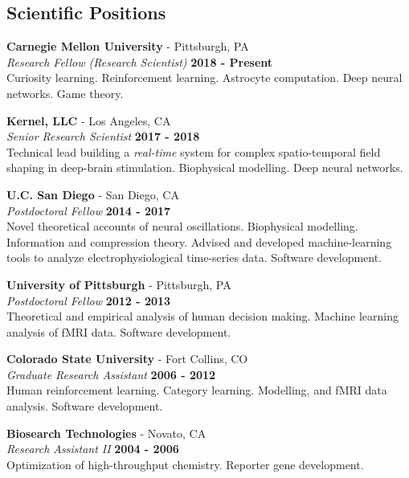 \documentclass[margin,line]{res}
\begin{document}
\begin{resume}
\section{\sc Scientific Positions}

{\bf Carnegie Mellon University} - Pittsburgh, PA \\
{\em Research Fellow (Research Scientist)} \hfill {\bf 2018 - Present}\\
Curiosity learning. Reinforcement learning. Astrocyte computation. Deep neural networks. Game theory.

{\bf Kernel, LLC} - Los Angeles, CA\\
{\em Senior Research Scientist} \hfill {\bf 2017 - 2018}\\
Technical lead building a \emph{real-time} system for complex spatio-temporal field shaping in deep-brain stimulation. Biophysical modelling. Deep neural networks.

{\bf U.C. San Diego} - San Diego, CA\\
{\em Postdoctoral Fellow} \hfill {\bf 2014 - 2017}\\
Novel theoretical accounts of neural oscillations. Biophysical modelling. Information and compression theory. Advised and developed machine-learning tools to analyze electrophysiological time-series data. Software development.

{\bf University of Pittsburgh} - Pittsburgh, PA\\
{\em Postdoctoral Fellow} \hfill {\bf 2012 - 2013}\\
Theoretical and empirical analysis of human decision making. Machine learning analysis of fMRI data. Software development.

{\bf Colorado State University} - Fort Collins, CO\\
{\em Graduate Research Assistant} \hfill {\bf 2006 - 2012}\\
Human reinforcement learning. Category learning. Modelling, and fMRI data analysis. Software development.

{\bf Biosearch Technologies} - Novato, CA\\
{\em Research Assistant II} \hfill {\bf 2004 - 2006}\\
Optimization of high-throughput chemistry. Reporter gene development.


\end{resume}
\end{document}

